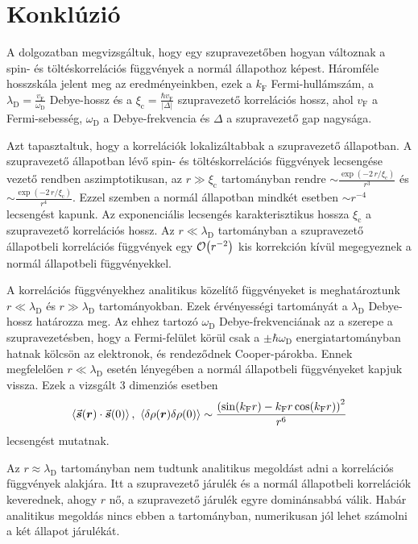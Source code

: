 \documentclass[a4paper,12pt,titlepage]{article}
\newcommand{\RR}{{\vb*{r}}}
\newcommand{\kF}{{k_\text{F}}}
\newcommand{\vF}{{v_\text{F}}}
\newcommand{\xic}{{\xi_\text{c}}}
\begin{document}
\section{Konklúzió}

A dolgozatban megvizsgáltuk, hogy egy szupravezetőben hogyan változnak a spin- és töltéskorrelációs függvények a normál állapothoz képest.  Háromféle hosszskála jelent meg az eredményeinkben, ezek a $\kF$ Fermi-hullámszám, a $\lambda_\text{D} = \frac{\vF}{\omega_\text{D}}$ Debye-hossz és a $\xic = \frac{\hbar \vF}{\left| \Delta \right|}$ szupravezető korrelációs hossz, ahol $\vF$ a Fermi-sebesség, $\omega_\text{D}$ a Debye-frekvencia és $\Delta$ a szupravezető gap nagysága.

Azt tapasztaltuk, hogy a korrelációk lokalizáltabbak a szupravezető állapotban.  A szupravezető állapotban lévő spin- és töltéskorrelációs függvények lecsengése vezető rendben aszimptotikusan, az $r \gg \xic$ tartományban rendre $\sim \frac{\exp(-2 \, r / \xic)}{r^3}$ és $\sim \frac{\exp(-2 \, r / \xic)}{r^4}$.  Ezzel szemben a normál állapotban mindkét esetben $\sim r^{-4}$ lecsengést kapunk.  Az exponenciális lecsengés karakterisztikus hossza $\xic$ a szupravezető korrelációs hossz.  Az $r \ll \lambda_\text{D}$ tartományban a szupravezető állapotbeli korrelációs függvények egy $\order{r^{-2}}$ kis korrekción kívül megegyeznek a normál állapotbeli függvényekkel.

A korrelációs függvényekhez analitikus közelítő függvényeket is meghatároztunk $r \ll \lambda_\text{D}$ és $r \gg \lambda_\text{D}$ tartományokban.  Ezek érvényességi tartományát a $\lambda_\text{D}$ Debye-hossz határozza meg.  Az ehhez tartozó $\omega_\text{D}$ Debye-frekvenciának az a szerepe a szupravezetésben, hogy a Fermi-felület körül csak a $\pm \hbar \omega_\text{D}$ energiatartományban hatnak kölcsön az elektronok, és rendeződnek Cooper-párokba.  Ennek megfelelően $r \ll \lambda_\text{D}$ esetén lényegében a normál állapotbeli függvényeket kapjuk vissza.  Ezek a vizsgált 3 dimenziós esetben
$$ \expval{\va*{s}(\RR) \cdot \va*{s}(0)}, \ \expval{\delta\rho(\RR) \delta\rho(0)} \sim \frac{\left( \sin(\kF r) - \kF r \cos(\kF r) \right)^2}{r^6} $$
lecsengést mutatnak.

Az $r \approx \lambda_\text{D}$ tartományban nem tudtunk analitikus megoldást adni a korrelációs függvények alakjára.  Itt a szupravezető járulék és a normál állapotbeli korrelációk keverednek, ahogy $r$ nő, a szupravezető járulék egyre dominánsabbá válik.  Habár analitikus megoldás nincs ebben a tartományban, numerikusan jól lehet számolni a két állapot járulékát.
\end{document}
